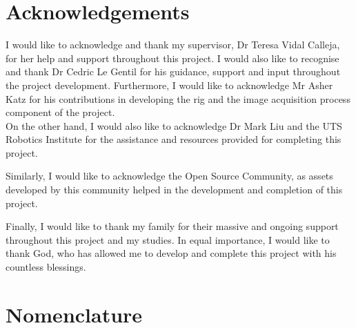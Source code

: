\documentclass[12pt]{report}
\begin{document}
\enlargethispage{\baselineskip}
\chapter*{Acknowledgements}
I would like to acknowledge and thank my supervisor, Dr Teresa Vidal Calleja, for her help and support throughout this project. I would also like to recognise and thank Dr Cedric Le Gentil for his guidance, support and input throughout the project development.
Furthermore, I would like to acknowledge Mr Asher Katz for his contributions in developing the rig and the image acquisition process component of the project.\\
On the other hand, I would also like to acknowledge Dr Mark Liu and the UTS Robotics Institute for the assistance and resources provided for completing this project.

Similarly, I would like to acknowledge the Open Source Community, as assets developed by this community helped in the development and completion of this project.

Finally, I would like to thank my family for their massive and ongoing support throughout this project and my studies. In equal importance, I would like to thank God, who has allowed me to develop and complete this project with his countless blessings.







\tableofcontents
\listoffigures
\listoftables

\chapter*{Nomenclature}
\end{document}

